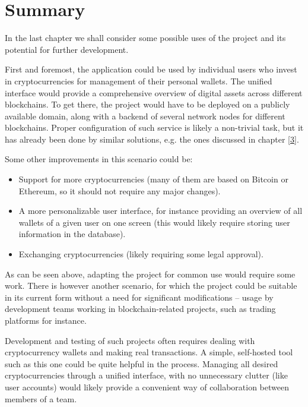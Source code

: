 \chapter{Summary}

In the last chapter we shall consider some possible uses of the project
and its potential for further development.

First and foremost, the application could be used by individual users
who invest in cryptocurrencies for management of their personal wallets.
The unified interface would provide a comprehensive overview
of digital assets across different blockchains.
To get there, the project would have to be deployed on a publicly available domain,
along with a backend of several network nodes for different blockchains.
Proper configuration of such service is likely a non-trivial task,
but it has already been done by similar solutions,
e.g. the ones discussed in chapter \ref{3}.

Some other improvements in this scenario could be:
\begin{itemize}
    \item Support for more cryptocurrencies
    (many of them are based on Bitcoin or Ethereum,
    so it should not require any major changes).
    \item A more personalizable user interface,
    for instance providing an overview of all wallets
    of a given user on one screen
    (this would likely require storing user information in the database).
    \item Exchanging cryptocurrencies
    (likely requiring some legal approval).
\end{itemize}

As can be seen above, adapting the project for common use
would require some work.
There is however another scenario, for which the project could
be suitable in its current form without a need for significant modifications
-- usage by development teams working in blockchain-related projects,
such as trading platforms for instance.

Development and testing of such projects often requires dealing
with cryptocurrency wallets and making real transactions.
A simple, self-hosted tool such as this one could be quite helpful
in the process.
Managing all desired cryptocurrencies through a unified interface,
with no unnecessary clutter (like user accounts) would likely
provide a convenient way of collaboration
between members of a team.

\newpage

